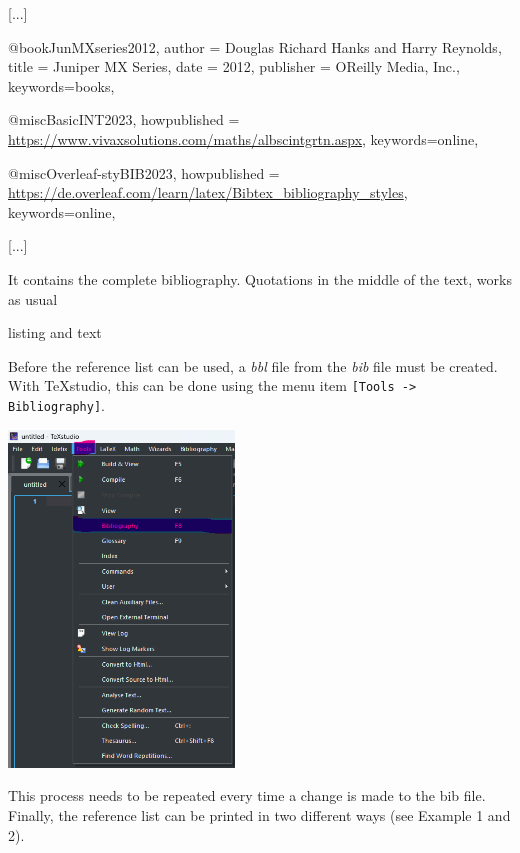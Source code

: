 \documentclass[]{myHOWTO-V001}
\begin{document}
\begin{mySTY}{}
[...]

@book{JunMXseries2012,
	author = {{Douglas Richard Hanks and Harry Reynolds}},
	title = {{Juniper MX Series}},
	date = {2012},
	publisher = {OReilly Media, Inc.},
	keywords={books},
}

@misc{BasicINT2023,
	howpublished = {\url{https://www.vivaxsolutions.com/maths/albscintgrtn.aspx}},
	keywords={online},
}

@misc{Overleaf-styBIB2023,
	howpublished = {\url{https://de.overleaf.com/learn/latex/Bibtex_bibliography_styles}},
	keywords={online},
}

[...]
\end{mySTY}

It contains the complete bibliography. Quotations in the middle of the text, works as usual

\begin{myTEXEX}{listing and text}
\lipsum[4] \cite{Overleaf-styBIB2023}	
\end{myTEXEX}

Before the reference list can be used, a \emph{bbl} file from the \emph{bib} file must be created. With \TeX studio, this can be done using the menu item \Verb|[Tools -> Bibliography]|.

\quad
\begin{myFIG}{}
	\includegraphics[width=6cm]{pictures/TeXstudio_bibliography.png}
\end{myFIG}

This process needs to be repeated every time a change is made to the bib file. Finally, the reference list can be printed in two different ways (see Example 1 and 2).
\end{document}
